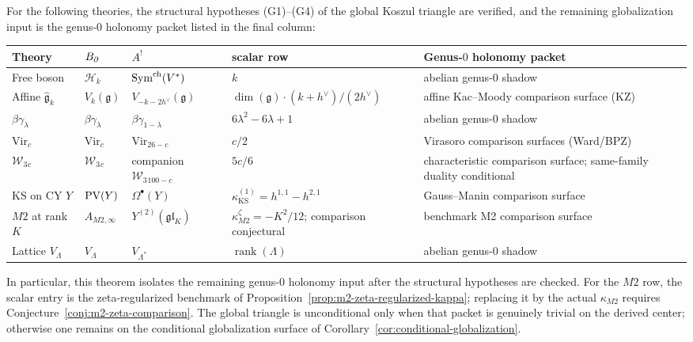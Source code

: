 \begin{theorem}
For the following theories, the structural hypotheses
\textup{(}G1\textup{)}--\textup{(}G4\textup{)} of the global
Koszul triangle are verified, and the remaining globalization
input is the genus-$0$ holonomy packet listed in the final
column:
\begin{center}
\renewcommand{\arraystretch}{1.3}
\begin{tabular}{lllll}
\textbf{Theory} & \textbf{$B_{\partial}$} & \textbf{$A^!$}
& \textbf{scalar row} & \textbf{Genus-$0$ holonomy packet} \\
\hline
Free boson & $\mathcal{H}_k$ & $\operatorname{Sym}^{\mathrm{ch}}(V^*)$ & $k$
& abelian genus-$0$ shadow \\
Affine $\hat{\mathfrak{g}}_k$ & $V_k(\mathfrak{g})$
& $V_{-k-2h^\vee}(\mathfrak{g})$
& $\dim(\mathfrak{g})\cdot(k+h^\vee)/(2h^\vee)$
& affine Kac--Moody comparison surface \textup{(}KZ\textup{)} \\
$\beta\gamma_\lambda$ & $\beta\gamma_\lambda$
& $\beta\gamma_{1-\lambda}$ & $6\lambda^2-6\lambda+1$
& abelian genus-$0$ shadow \\
$\mathrm{Vir}_c$ & $\mathrm{Vir}_c$ & $\mathrm{Vir}_{26-c}$
& $c/2$
& Virasoro comparison surfaces \textup{(}Ward/BPZ\textup{)} \\
$\mathcal{W}_3{}_c$ & $\mathcal{W}_3{}_c$
& companion $\mathcal{W}_3{}_{100-c}$ & $5c/6$
& characteristic comparison surface; same-family duality conditional \\
KS on CY $Y$ & $\operatorname{PV}(Y)$ & $\Omega^\bullet(Y)$
& $\kappa_{\mathrm{KS}}^{(1)}=h^{1,1}-h^{2,1}$
& Gauss--Manin comparison surface \\
$M2$ at rank $K$ & $A_{M2,\infty}$ & $Y^{(2)}(\mathfrak{gl}_K)$
& $\kappa_{M2}^{\zeta}=-K^2/12$; comparison conjectural
& benchmark M2 comparison surface \\
Lattice $V_\Lambda$ & $V_\Lambda$ & $V_{\Lambda^*}$
& $\operatorname{rank}(\Lambda)$ & abelian genus-$0$ shadow
\end{tabular}
\end{center}
In particular, this theorem isolates the remaining genus-$0$
holonomy input after the structural hypotheses are checked.
For the \(M2\) row, the scalar entry is the zeta-regularized benchmark
of Proposition~\ref{prop:m2-zeta-regularized-kappa}; replacing it by
the actual \(\kappa_{M2}\) requires
Conjecture~\ref{conj:m2-zeta-comparison}.  The global triangle is
unconditional only when that packet is
genuinely trivial on the derived center; otherwise one remains on
the conditional globalization surface of
Corollary~\ref{cor:conditional-globalization}.
\end{theorem}

